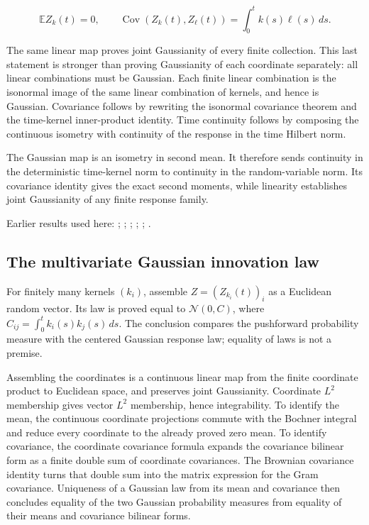\documentclass[11pt,a4paper]{report}
\begin{document}
\[\mathbb E Z_k(t)=0,\qquad \operatorname{Cov}(Z_k(t),Z_\ell(t))=\int_0^t k(s)\ell(s)\,ds.\]

The same linear map proves joint Gaussianity of every finite collection. This last statement is stronger than proving Gaussianity of each coordinate separately: all linear combinations must be Gaussian. Each finite linear combination is the isonormal image of the same linear combination of kernels, and hence is Gaussian. Covariance follows by rewriting the isonormal covariance theorem and the time-kernel inner-product identity. Time continuity follows by composing the continuous isometry with continuity of the response in the time Hilbert norm.



The Gaussian map is an isometry in second mean. It therefore sends continuity in the deterministic time-kernel norm to continuity in the random-variable norm. Its covariance identity gives the exact second moments, while linearity establishes joint Gaussianity of any finite response family.



Earlier results used here: \cite[Section~3.6.12]{LangevinLean2026ULASC}; \cite[Section~3.6.17]{LangevinLean2026ULASC}; \cite[Section~3.6.25]{LangevinLean2026ULASC}; \cite[Section~3.6.26]{LangevinLean2026ULASC}; \cite[Section~3.7.1]{LangevinLean2026ULASC}; \cite[Section~3.8.5]{LangevinLean2026ULASC}.
\subsection{\texorpdfstring{The multivariate Gaussian innovation law}{The multivariate Gaussian innovation law}}
\label{report-step-KineticLangevin-BrownianConvolution-lean-6}


For finitely many kernels \((k_i)\), assemble \(Z=(Z_{k_i}(t))_i\) as a Euclidean random vector. Its law is proved equal to \(\mathcal N(0,C)\), where \(C_{ij}=\int_0^t k_i(s)k_j(s)\,ds\). The conclusion compares the pushforward probability measure with the centered Gaussian response law; equality of laws is not a premise.



Assembling the coordinates is a continuous linear map from the finite coordinate product to Euclidean space, and preserves joint Gaussianity. Coordinate \(L^{2}\) membership gives vector \(L^{2}\) membership, hence integrability. To identify the mean, the continuous coordinate projections commute with the Bochner integral and reduce every coordinate to the already proved zero mean. To identify covariance, the coordinate covariance formula expands the covariance bilinear form as a finite double sum of coordinate covariances. The Brownian covariance identity turns that double sum into the matrix expression for the Gram covariance. Uniqueness of a Gaussian law from its mean and covariance then concludes equality of the two Gaussian probability measures from equality of their means and covariance bilinear forms.
\end{document}
